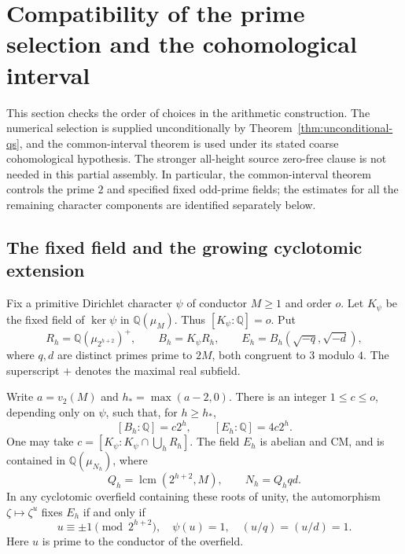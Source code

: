 \section{Compatibility of the prime selection and the cohomological interval}
\label{sec:selection-assembly}

This section checks the order of choices in the arithmetic construction.
The numerical selection is supplied unconditionally by
Theorem~\ref{thm:unconditional-qs}, and the common-interval theorem is
used under its stated coarse cohomological hypothesis. The stronger
all-height source zero-free clause is not needed in this partial assembly. In particular, the
common-interval theorem controls the prime $2$ and specified fixed
odd-prime fields; the estimates for all the remaining character components
are identified separately below.

\subsection{The fixed field and the growing cyclotomic extension}

Fix a primitive Dirichlet character $\psi$ of conductor $M\ge1$ and
order $o$. Let $K_\psi$ be the fixed field of $\ker\psi$ in
$\mathbb Q(\mu_M)$. Thus $[K_\psi:\mathbb Q]=o$. Put
\[
 R_h=\mathbb Q(\mu_{2^{h+2}})^+,
 \qquad B_h=K_\psi R_h,
 \qquad E_h=B_h(\sqrt{-q},\sqrt{-d}),
\]
where $q,d$ are distinct primes prime to $2M$, both congruent to $3$
modulo $4$. The superscript $+$ denotes the maximal real subfield.

\begin{lemma}\label{sa-fields}
Write $a=v_2(M)$ and $h_*=\max(a-2,0)$. There is an integer
$1\le c\le o$, depending only on $\psi$, such that, for $h\ge h_*$,
\[
 [B_h:\mathbb Q]=c2^h,\qquad [E_h:\mathbb Q]=4c2^h.
\]
One may take
$c=[K_\psi:K_\psi\cap\bigcup_hR_h]$.
The field $E_h$ is abelian and CM, and is contained in
$\mathbb Q(\mu_{N_h})$, where
\[
 Q_h=\operatorname{lcm}(2^{h+2},M),\qquad N_h=Q_hqd.
\]
In any cyclotomic overfield containing these roots of unity, the
automorphism $\zeta\mapsto\zeta^u$ fixes $E_h$ if and only if
\begin{equation}\label{sa-field-kernel}
 u\equiv\pm1\pmod{2^{h+2}},\quad
 \psi(u)=1,\quad (u/q)=(u/d)=1.
\end{equation}
Here $u$ is prime to the conductor of the overfield.
\end{lemma}

